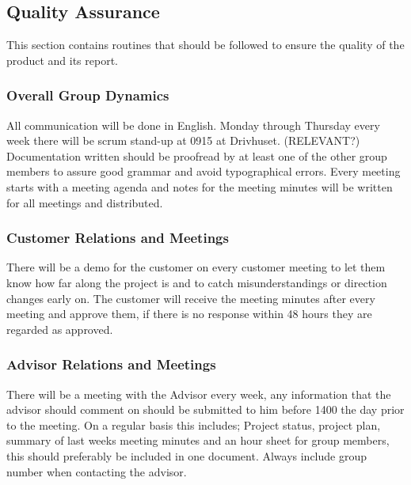 \subsection{Quality Assurance}

This section contains routines that should be followed to ensure the
quality of the product and its report.

\subsubsection{Overall Group Dynamics}

All communication will be done in English.
Monday through Thursday every week there will be scrum stand-up at 0915 at Drivhuset. (RELEVANT?)
Documentation written should be proofread by at least one of the other group members
to assure good grammar and avoid typographical errors.
Every meeting starts with a meeting agenda and notes for the meeting minutes will be
written for all meetings and distributed.

\subsubsection{Customer Relations and Meetings}

There will be a demo for the customer on every customer meeting to let them
know how far along the project is and to catch misunderstandings or direction changes early on.
The customer will receive the meeting minutes after every meeting and approve them,
if there is no response within 48 hours they are regarded as approved.

\subsubsection{Advisor Relations and Meetings}

There will be a meeting with the Advisor every week, any information that the advisor
should comment on should be submitted to him before 1400 the day prior to the meeting.
On a regular basis this includes; Project status, project plan, summary of last weeks
meeting minutes and an hour sheet for group members, this should preferably be included in one document.
Always include group number when contacting the advisor.
